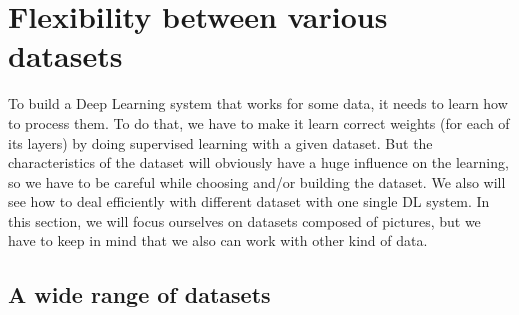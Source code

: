 \chapter{Flexibility between various datasets}

To build a Deep Learning system that works for some data, it needs to learn how to process them. To do that, we have to make it learn correct weights (for each of its layers) by doing supervised learning with a given dataset. But the characteristics of the dataset will obviously have a huge influence on the learning, so we have to be careful while choosing and/or building the dataset. We also will see how to deal efficiently with different dataset with one single DL system. In this section, we will focus ourselves on datasets composed of pictures, but we have to keep in mind that we also can work with other kind of data.



\section{A wide range of datasets}
